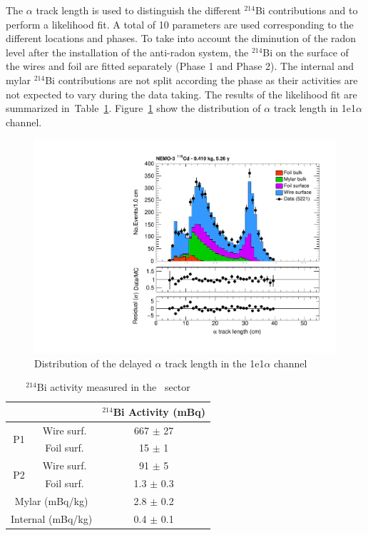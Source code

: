 \documentclass[main.tex]{subfiles}
\begin{document}
\bigskip


\NI The $\alpha$ track length is used to distinguish the different $^{\text{214}}$Bi contributions and to perform a likelihood fit. A total of 10 parameters are used corresponding to the different locations and phases. To take into account the diminution of the radon level after the installation of the anti-radon system, the $^{\text{214}}$Bi on the surface of the wires and foil are fitted separately (Phase 1 and Phase 2). The internal and mylar $^{\text{214}}$Bi contributions are not split according the phase as their activities are not expected to vary during the data taking. The results of the likelihood fit are summarized in~Table~\ref{Table1e1a-activityMeasurement}. Figure~\ref{1e1aChannel_alpphaLength} show the distribution of $\alpha$ track length in 1e1$\alpha$ channel.


\begin{figure}[h!]
\centering
\includegraphics[page=1,scale=0.55]{pictures/Chap6/FinalPlots.pdf}
\caption{Distribution of the delayed $\alpha$ track length in the 1e1$\alpha$ channel}
\label{1e1aChannel_alpphaLength}
\end{figure}





\begin{table}
\centering
\begin{tabular}{cc|c}
                    &            &  $^{\text{214}}$Bi Activity (mBq) \\
\toprule
\multirow{2}{*}{P1} & Wire surf. & 667 $\pm$ 27 \\ 
                    & Foil surf. & 15 $\pm$ 1 \\
\hline
\multirow{2}{*}{P2} & Wire surf. & 91 $\pm$ 5 \\ 
                    & Foil surf. & 1.3 $\pm$ 0.3 \\
\hline
\multicolumn{2}{c|}{Mylar (mBq/kg)}  & 2.8 $\pm$ 0.2 \\
\hline
\multicolumn{2}{c|}{Internal (mBq/kg)}  & 0.4 $\pm$ 0.1 \\
\bottomrule
\end{tabular}
\caption{$^{\text{214}}$Bi  activity measured in the \Cd~sector}
\label{Table1e1a-activityMeasurement}
\end{table}
\end{document}
